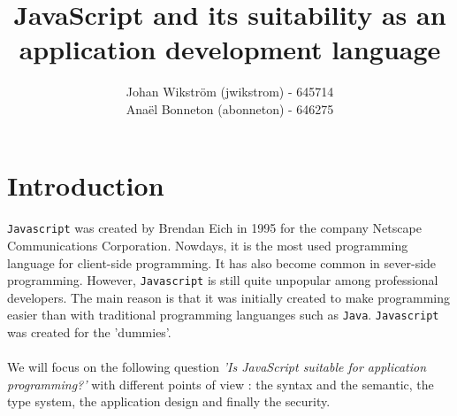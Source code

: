 \documentclass{report}
\title{JavaScript and its suitability as an application development language}
\author{Johan Wikström (jwikstrom) - 645714\\
Anaël Bonneton (abonneton) - 646275 
}
\begin{document}
\maketitle
\tableofcontents

\section{Introduction}
\paragraph{}
\texttt{Javascript} was created by Brendan Eich in 1995 for the company Netscape Communications Corporation. Nowdays, it is the most used programming language for client-side programming. It has also become common in sever-side programming. However, \texttt{Javascript} is still quite unpopular among professional developers. The main reason is that it was initially created to make programming easier than with traditional programming languanges such as \texttt{Java}. \texttt{Javascript} was created for the 'dummies'.
\paragraph{}
We will focus on the following question \emph{'Is JavaScript suitable for application programming?'} with different points of view : the syntax and the semantic, the type system, the application design and finally the security. 

\end{document}
